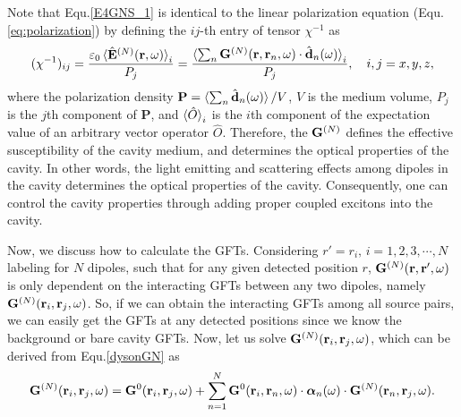 Note that Equ.\eqref{E4GNS_1} is identical to the linear polarization equation (Equ.\eqref{eq:polarization}) by defining the $ij$-th entry of tensor $\chi^{-1}$ as
\begin{equation}
(\mathbf{\chi}^{-1})_{ij}=\frac{\varepsilon_0 \mathinner{\langle{\hat{\mathbf{E}}^{(N)}(\mathbf{r},\omega)}\rangle}_i}{P_j}=\frac{\mathinner{\langle{\sum_n{\mathbf{G}^{(N)}(\mathbf{r},\mathbf{r}_n,\omega)\cdot \hat{\mathbf{d}}_n(\omega)}}\rangle}_i}{P_j},\quad i,j=x,y,z,
\end{equation}
where the polarization density
$\mathbf{P}=\mathinner{\langle{\sum_n{\hat{\mathbf{d}}_n(\omega)}}\rangle}/V$, $V$ is the medium volume, $P_j$ is the $j$th component of $\mathbf{P}$, and $\mathinner{\langle{\hat{O}}\rangle} _i$ is the $i$th component of the expectation value of an arbitrary vector operator $\hat{O}$. Therefore, the $\mathbf{G}^{(N)}$ defines the effective susceptibility of the cavity medium, and determines the optical properties of the cavity. In other words, the light emitting and scattering effects among dipoles in the cavity determines the optical properties of the cavity. Consequently, one can control the cavity properties through adding proper coupled excitons into the cavity.


Now, we discuss how to calculate the GFTs. Considering $r'=r_i,\, i=1,2,3,\cdots,N$ labeling for $N$ dipoles, such that for any given detected position $r$, $\mathbf{G}^{(N)}(\mathbf{r},\mathbf{r}',\omega)$ is only dependent on the interacting GFTs between any two dipoles, namely $\mathbf{G}^{(N)}(\mathbf{r}_i,\mathbf{r}_j,\omega)$. So, if we can obtain the interacting GFTs among all source pairs, we can easily get the GFTs at any detected positions since we know the background or bare cavity GFTs. Now, let us solve $\mathbf{G}^{(N)}(\mathbf{r}_i,\mathbf{r}_j,\omega)$, which can be derived from Equ.\eqref{dysonGN} as
\begin{equation}
 \mathbf{G}^{(N)}(\mathbf{r}_i,\mathbf{r}_j,\omega)=\mathbf{G}^0(\mathbf{r}_i,\mathbf{r}_j,\omega) +\sum_{n=1}^N{\mathbf{G}^0(\mathbf{r}_i,\mathbf{r}_n,\omega)\cdot {\bm \alpha}_n(\omega) \cdot \mathbf{G}^{(N)}(\mathbf{r}_n,\mathbf{r}_j,\omega)}.
\end{equation}


